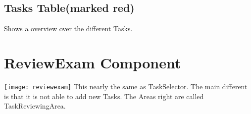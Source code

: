 \subsection{Tasks Table(marked red)}
Shows a overview over the different Tasks.

\section{ReviewExam Component}
\texttt{[image: reviewexam]}
This nearly the same as TaskSelector.
The main different is that it is not able to add new Tasks.
The Areas right are called TaskReviewingArea.
